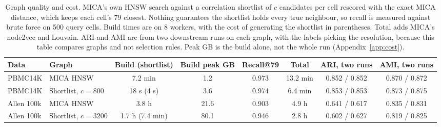 \begin{table}[t]
\centering
\caption{Graph quality and cost. MICA's own HNSW search against a correlation shortlist of $c$ candidates per cell rescored with the exact MICA distance, which keeps each cell's 79 closest. Nothing guarantees the shortlist holds every true neighbour, so recall is measured against brute force on 500 query cells. Build times are on 8 workers, with the cost of generating the shortlist in parentheses. Total adds MICA's node2vec and Louvain. ARI and AMI are from two downstream runs on each graph, with the labels picking the resolution, because this table compares graphs and not selection rules. Peak GB is the build alone, not the whole run (Appendix~\ref{app:cost}).}
\label{tab:graph}
\footnotesize
\setlength{\tabcolsep}{4pt}
\begin{tabular}{llcccccc}
\toprule
Data & Graph & Build (shortlist) & Build peak GB & Recall@79 & Total & ARI, two runs & AMI, two runs \\
\midrule
PBMC14K & MICA HNSW & 7.2 min & 1.2 & 0.973 & 13.2 min & 0.852 / 0.852 & 0.870 / 0.872 \\
PBMC14K & Shortlist, $c=800$ & 18 s (4 s) & 3.6 & 0.974 & 6.4 min & 0.853 / 0.853 & 0.873 / 0.875 \\
\midrule
Allen 100k & MICA HNSW & 3.8 h & 21.6 & 0.903 & 4.9 h & 0.641 / 0.617 & 0.835 / 0.831 \\
Allen 100k & Shortlist, $c=3200$ & 1.7 h (7.4 min) & 80.1 & 0.946 & 2.8 h & 0.602 / 0.627 & 0.819 / 0.825 \\
\bottomrule
\end{tabular}
\end{table}
